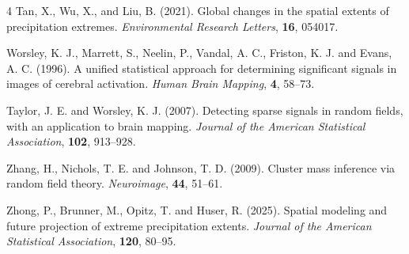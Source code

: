 \documentclass[aap,preprint]{imsart}
\theoremstyle{plain}
\theoremstyle{definition}
\begin{document}
\begin{thebibliography}{4}
		Tan, X., Wu, X., and Liu, B. (2021). Global changes in the spatial extents of precipitation extremes. \emph{Environmental Research Letters}, {\bf 16}, 054017.
		
		Worsley, K. J., Marrett, S., Neelin, P., Vandal, A. C., Friston, K. J. and Evans, A. C. (1996). A unified statistical approach for determining significant signals in images of cerebral activation. \emph{Human Brain Mapping}, {\bf 4}, 58--73.
		
		Taylor, J. E. and Worsley, K. J. (2007). Detecting sparse signals in random fields, with an application to brain mapping. \emph{Journal of the American Statistical Association}, {\bf 102}, 913--928.
		
		Zhang, H.,  Nichols, T. E. and Johnson, T. D. (2009). Cluster mass inference via random field theory. \emph{Neuroimage}, {\bf 44}, 51--61.
		
		Zhong, P., Brunner, M., Opitz, T. and Huser, R. (2025). Spatial modeling and future projection of extreme precipitation extents. \emph{Journal of the American Statistical Association}, {\bf 120}, 80--95.
	\end{thebibliography}
	
\end{document}
